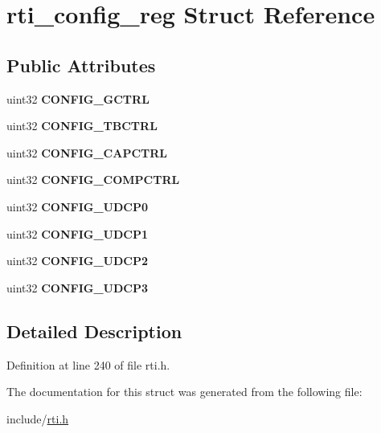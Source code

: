 \hypertarget{structrti__config__reg}{}\section{rti\+\_\+config\+\_\+reg Struct Reference}
\label{structrti__config__reg}
\subsection*{Public Attributes}
\begin{DoxyCompactItemize}
\item 
\mbox{\label{structrti__config__reg_a43c98650e268f0050625dfa11087e0b6}} 
uint32 {\bfseries C\+O\+N\+F\+I\+G\+\_\+\+G\+C\+T\+RL}
\item 
\mbox{\label{structrti__config__reg_af72566dc524fdd9228847929685e8a91}} 
uint32 {\bfseries C\+O\+N\+F\+I\+G\+\_\+\+T\+B\+C\+T\+RL}
\item 
\mbox{\label{structrti__config__reg_aa3660a8ad3352bd56226b5f58320eca4}} 
uint32 {\bfseries C\+O\+N\+F\+I\+G\+\_\+\+C\+A\+P\+C\+T\+RL}
\item 
\mbox{\label{structrti__config__reg_a15ea7ac8ed74139d1cf2663103464498}} 
uint32 {\bfseries C\+O\+N\+F\+I\+G\+\_\+\+C\+O\+M\+P\+C\+T\+RL}
\item 
\mbox{\label{structrti__config__reg_a782445dc383849065598147ce70837e4}} 
uint32 {\bfseries C\+O\+N\+F\+I\+G\+\_\+\+U\+D\+C\+P0}
\item 
\mbox{\label{structrti__config__reg_a53db327a76fc9d7ae8fcc17639371a82}} 
uint32 {\bfseries C\+O\+N\+F\+I\+G\+\_\+\+U\+D\+C\+P1}
\item 
\mbox{\label{structrti__config__reg_ab613b2f83fc912023954069748ef6906}} 
uint32 {\bfseries C\+O\+N\+F\+I\+G\+\_\+\+U\+D\+C\+P2}
\item 
\mbox{\label{structrti__config__reg_af7b68f2fa12da993a64bb0ac250a995a}} 
uint32 {\bfseries C\+O\+N\+F\+I\+G\+\_\+\+U\+D\+C\+P3}
\end{DoxyCompactItemize}


\subsection{Detailed Description}


Definition at line 240 of file rti.\+h.



The documentation for this struct was generated from the following file\+:\begin{DoxyCompactItemize}
\item 
include/\mbox{\hyperlink{rti_8h}{rti.\+h}}\end{DoxyCompactItemize}
